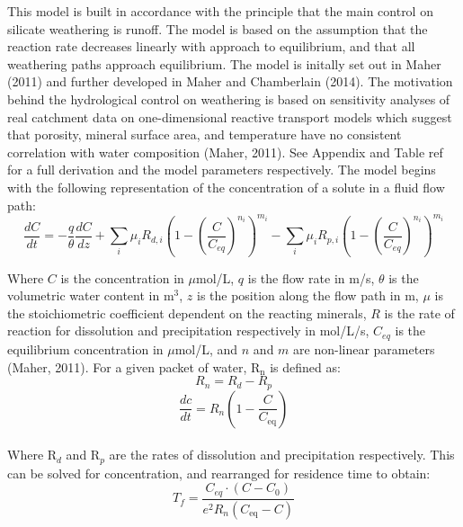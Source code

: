 This model is built in accordance with the principle that the main control on silicate weathering is runoff. The model is based on the assumption that the reaction rate decreases linearly with approach to equilibrium, and that all weathering paths approach equilibrium. The model is initally set out in Maher (2011) and further developed in Maher and Chamberlain (2014). The motivation behind the hydrological control on weathering is based on sensitivity analyses of real catchment data on one-dimensional reactive transport models which suggest that porosity, mineral surface area, and temperature have no consistent correlation with water composition (Maher, 2011). See Appendix and Table ref for a full derivation and the model parameters respectively. The model begins with the following representation of the concentration of a solute in a fluid flow path:\\ 

\begin{equation}
    \frac{dC}{dt} = -\frac{q}{\theta} \frac{dC}{dz} + \sum_i \mu_i R_{d,i} \left( 1 - \left( \frac{C}{C_{eq}} \right)^{n_i} \right)^{m_i} - \sum_i \mu_i R_{p,i} \left( 1 - \left( \frac{C}{C_{eq}} \right)^{n_i} \right)^{m_i}
\end{equation}

Where \( C \) is the concentration in $\mu$mol/L, \( q \) is the flow rate in m/s, \( \theta \) is the volumetric water content in m$^3$, \( z \) is the position along the flow path in m, \( \mu \) is the stoichiometric coefficient dependent on the reacting minerals, \( R \) is the rate of reaction for dissolution and precipitation respectively in mol/L/s, \( C_{eq} \) is the equilibrium concentration in $\mu$mol/L, and \( n \) and \( m \) are non-linear parameters (Maher, 2011). For a given packet of water, R$_{\text{n}}$ is defined as: \\

\begin{equation}
R_n = R_{d} - R_{p}
\end{equation} 
\begin{equation}
\frac{dc}{dt} = R_n \left( 1 - \frac{C}{C_{\text{eq}}} \right)
\end{equation} \\

Where R$_d$ and R$_p$ are the rates of dissolution and precipitation respectively. This can be solved for concentration, and rearranged for residence time to obtain:\\

\begin{equation}
    T_f = \frac{C_{eq} \cdot \left(C - C_0\right)}{e^2 R_n \left( C_{\text{eq}} - C \right)}
\end{equation}\\

